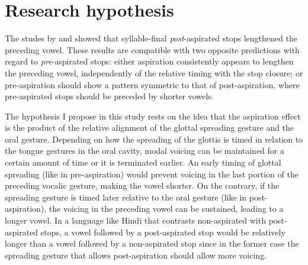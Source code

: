 \documentclass[11pt,a4paper,openany]{memoir}\usepackage[]{graphicx}\usepackage[]{color}
\begin{document}


\section{Research hypothesis}
\label{s:hypothesis}

The studes by \citet{maddieson1976} and \citet{durvasula2012} showed that syllable-final \textit{post}-aspirated stops lengthened the preceding vowel.
These results are compatible with two opposite predictions with regard to \textit{pre}-aspirated stops: either aspiration consistently appears to lengthen the preceding vowel, independently of the relative timing with the stop closure; or pre-aspiration should show a pattern symmetric to that of post-aspiration, where pre-aspirated stops should be preceded by shorter vowels.

The hypothesis I propose in this study rests on the idea that the aspiration effect is the product of the relative alignment of the glottal spreading gesture and the oral gesture.
Depending on how the spreading of the glottis is timed in relation to the tongue gestures in the oral cavity, modal voicing can be maintained for a certain amount of time or it is terminated earlier.
An early timing of glottal spreading (like in pre-aspiration) would prevent voicing in the last portion of the preceding vocalic gesture, making the vowel shorter.
On the contrary, if the spreading gesture is timed later relative to the oral gesture (like in post-aspiration), the voicing in the preceding vowel can be sustained, leading to a longer vowel.
In a language like Hindi that contrasts non-aspirated with post-aspirated stops, a vowel followed by a post-aspirated stop would be relatively longer than a vowel followed by a non-aspirated stop since in the former case the spreading gesture that allows post-aspiration should allow more voicing.
\end{document}
